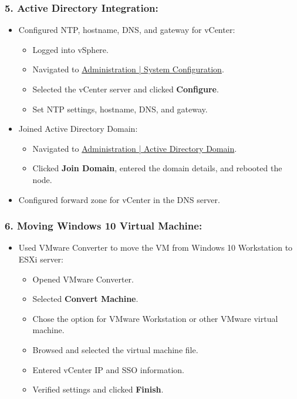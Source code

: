 \documentclass[letterpaper]{article}
\begin{document}
\subsubsection{5. Active Directory Integration:}
\label{sec:orgdf03417}
\begin{itemize}
\item Configured NTP, hostname, DNS, and gateway for vCenter:
\begin{itemize}
\item Logged into vSphere.
\item Navigated to \uline{Administration | System Configuration}.
\item Selected the vCenter server and clicked \textbf{Configure}.
\item Set NTP settings, hostname, DNS, and gateway.
\end{itemize}
\item Joined Active Directory Domain:
\begin{itemize}
\item Navigated to \uline{Administration | Active Directory Domain}.
\item Clicked \textbf{Join Domain}, entered the domain details, and rebooted the node.
\end{itemize}
\item Configured forward zone for vCenter in the DNS server.
\end{itemize}

\subsubsection{6. Moving Windows 10 Virtual Machine:}
\label{sec:org2ddf4ce}
\begin{itemize}
\item Used VMware Converter to move the VM from Windows 10 Workstation to ESXi server:
\begin{itemize}
\item Opened VMware Converter.
\item Selected \textbf{Convert Machine}.
\item Chose the option for VMware Workstation or other VMware virtual machine.
\item Browsed and selected the virtual machine file.
\item Entered vCenter IP and SSO information.
\item Verified settings and clicked \textbf{Finish}.
\end{itemize}
\end{itemize}
\end{document}
